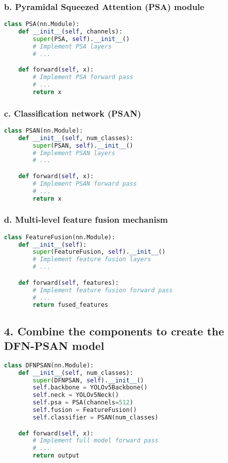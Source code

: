 \documentclass[12pt,a4paper]{article}
\begin{document}
\subsubsection{b. Pyramidal Squeezed Attention (PSA) module}
\begin{lstlisting}[language=Python, caption=Pyramidal Squeezed Attention]
class PSA(nn.Module):
    def __init__(self, channels):
        super(PSA, self).__init__()
        # Implement PSA layers
        # ...

    def forward(self, x):
        # Implement PSA forward pass
        # ...
        return x
\end{lstlisting}

\subsubsection{c. Classification network (PSAN)}
\begin{lstlisting}[language=Python, caption=Classification Network (PSAN)]
class PSAN(nn.Module):
    def __init__(self, num_classes):
        super(PSAN, self).__init__()
        # Implement PSAN layers
        # ...

    def forward(self, x):
        # Implement PSAN forward pass
        # ...
        return x
\end{lstlisting}

\subsubsection{d. Multi-level feature fusion mechanism}
\begin{lstlisting}[language=Python, caption=Multi-level Feature Fusion]
class FeatureFusion(nn.Module):
    def __init__(self):
        super(FeatureFusion, self).__init__()
        # Implement feature fusion layers
        # ...

    def forward(self, features):
        # Implement feature fusion forward pass
        # ...
        return fused_features
\end{lstlisting}

\subsection{4. Combine the components to create the DFN-PSAN model}
\begin{lstlisting}[language=Python, caption=DFN-PSAN Model]
class DFNPSAN(nn.Module):
    def __init__(self, num_classes):
        super(DFNPSAN, self).__init__()
        self.backbone = YOLOv5Backbone()
        self.neck = YOLOv5Neck()
        self.psa = PSA(channels=512)
        self.fusion = FeatureFusion()
        self.classifier = PSAN(num_classes)

    def forward(self, x):
        # Implement full model forward pass
        # ...
        return output
\end{lstlisting}
\end{document}
